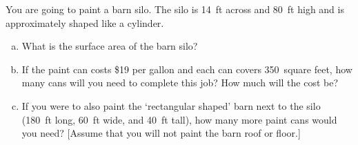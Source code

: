 \documentclass[11pt,letterpaper]{article}
\begin{document}
\newpage



 You are going to paint a barn silo. The silo is 14~ft across and 80~ft high and is approximately shaped like a cylinder. 
	\begin{enumerate}[(a)]
	\item What is the surface area of the barn silo?
	\item If the paint can costs \$19 per gallon and each can covers 350~square feet, how many cans will you need to complete this job? How much will the cost be?
	\item If you were to also paint the `rectangular shaped' barn next to the silo (180~ft long, 60~ft wide, and 40~ft tall), how many more paint cans would you need? [Assume that you will not paint the barn roof or floor.]
	\end{enumerate} \pspace
\end{document}
